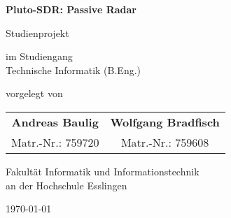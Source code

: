 \begin{titlepage}
    \begin{center}
        \vspace*{1cm}
        {\Huge \textbf{Pluto-SDR\@: Passive Radar}}

        \vspace{0.5cm}

        {\Large Studienprojekt}

        \vspace{1cm}

        

        \vspace{1cm}

        \large
        im Studiengang \\
        \Large
        Technische Informatik (B.Eng.)

        \vspace{1cm}

        \large
        vorgelegt von

        \vspace{0.25cm}

        \Large
        \begin{tabular}{c c}
            \textbf{Andreas Baulig} & \textbf{Wolfgang Bradfisch} \\
            Matr.-Nr.: 759720       & Matr.-Nr.: 759608           \\
        \end{tabular}

        \vspace{0.5cm}

        Fakultät Informatik und Informationstechnik \\
        an der Hochschule Esslingen

        \vfill

        \today

    \end{center}
\end{titlepage}
